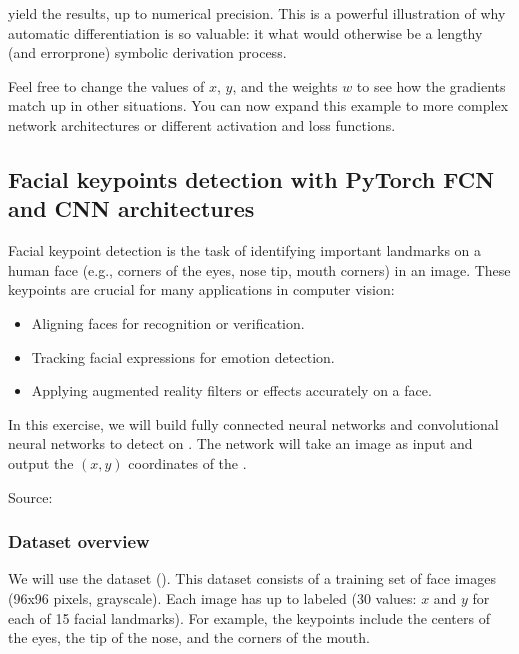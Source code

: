 \documentclass[letterpaper,10pt,english]{jupyterBook}
\begin{document}
\sphinxAtStartPar
yield the  results, up to numerical precision. This is a powerful illustration of why automatic differentiation is so valuable: it  what would otherwise be a lengthy (and error\sphinxhyphen{}prone) symbolic derivation process.

\sphinxAtStartPar
Feel free to change the values of \(x\), \(y\), and the weights \(w\) to see how the gradients match up in other situations.
You can now expand this example to more complex network architectures or different activation and loss functions.


\subsection{Facial keypoints detection with PyTorch FCN and CNN architectures}
\label{\detokenize{04:facial-keypoints-detection-with-pytorch-fcn-and-cnn-architectures}}
\sphinxAtStartPar
Facial keypoint detection is the task of identifying important landmarks on a human face (e.g., corners of the eyes, nose tip, mouth corners) in an image. These keypoints are crucial for many applications in computer vision:
\begin{itemize}
\item {} 
\sphinxAtStartPar
Aligning faces for recognition or verification.

\item {} 
\sphinxAtStartPar
Tracking facial expressions for emotion detection.

\item {} 
\sphinxAtStartPar
Applying augmented reality filters or effects accurately on a face.

\end{itemize}

\sphinxAtStartPar
In this exercise, we will build fully connected neural networks and convolutional neural networks to detect  on . The network will take an image as input and output the \( (x,y) \) coordinates of the .

\sphinxAtStartPar
Source: 


\subsubsection{Dataset overview}
\label{\detokenize{04:dataset-overview}}
\sphinxAtStartPar
We will use the  dataset (). This dataset consists of a training set of  face images (96x96 pixels, grayscale). Each image has up to  labeled (30 values: \( x \) and \( y \) for each of 15 facial landmarks). For example, the keypoints include the centers of the eyes, the tip of the nose, and the corners of the mouth.
\end{document}
